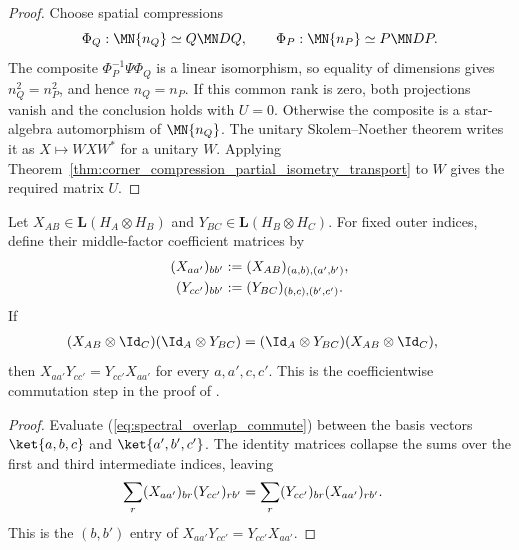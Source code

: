 \begin{proof}\leanok
    Choose spatial compressions
    \[
        \Phi_Q:\MN{n_Q}\simeq Q\MN DQ,\qquad
        \Phi_P:\MN{n_P}\simeq P\MN DP.
    \]
    The composite $\Phi_P^{-1}\Psi\Phi_Q$ is a linear isomorphism, so equality
    of dimensions gives $n_Q^2=n_P^2$, and hence $n_Q=n_P$. If this common
    rank is zero, both projections vanish and the conclusion holds with
    $U=0$. Otherwise the composite is a star-algebra automorphism of
    $\MN{n_Q}$. The unitary Skolem--Noether theorem writes it as
    $X\mapsto WXW^*$ for a unitary $W$. Applying
    Theorem~\ref{thm:corner_compression_partial_isometry_transport} to $W$
    gives the required matrix $U$.
\end{proof}
\begin{theorem}%
    \label{thm:commuting_overlapping_middle_coefficients}
    \leanok
    Let $X_{AB}\in\mathbf L(H_A\otimes H_B)$ and
    $Y_{BC}\in\mathbf L(H_B\otimes H_C)$. For fixed outer indices, define
    their middle-factor coefficient matrices by
    \begin{align}
        (X_{aa'})_{bb'}
         & :=(X_{AB})_{(a,b),(a',b')}, \notag \\
        (Y_{cc'})_{bb'}
         & :=(Y_{BC})_{(b,c),(b',c')}.
        \notag
    \end{align}
    If
    \begin{align}
        (X_{AB}\otimes\Id_C)(\Id_A\otimes Y_{BC})
         & =(\Id_A\otimes Y_{BC})(X_{AB}\otimes\Id_C),
        \label{eq:spectral_overlap_commute}
    \end{align}
    then $X_{aa'}Y_{cc'}=Y_{cc'}X_{aa'}$ for every $a,a',c,c'$. This is
    the coefficientwise commutation step in the proof of
    \cite[Lemma~2.1]{Beigi2012Classification}.
\end{theorem}

\begin{proof}
    \leanok
    Evaluate (\ref{eq:spectral_overlap_commute}) between the basis vectors
    $\ket{a,b,c}$ and $\ket{a',b',c'}$. The identity matrices collapse the
    sums over the first and third intermediate indices, leaving
    \begin{align}
        \sum_r(X_{aa'})_{br}(Y_{cc'})_{rb'}
         & =\sum_r(Y_{cc'})_{br}(X_{aa'})_{rb'}.
        \notag
    \end{align}
    This is the $(b,b')$ entry of
    $X_{aa'}Y_{cc'}=Y_{cc'}X_{aa'}$.
\end{proof}

